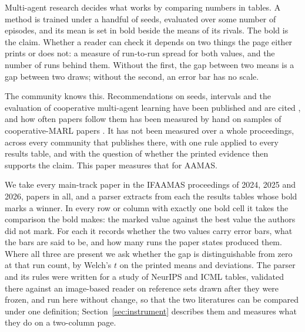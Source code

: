 \documentclass[sigconf,anonymous]{aamas}
\begin{document}
Multi-agent research decides what works by comparing numbers in tables. A
method is trained under a handful of seeds, evaluated over some number of
episodes, and its mean is set in bold beside the means of its rivals. The bold
is the claim. Whether a reader can check it depends on two things the page
either prints or does not: a measure of run-to-run spread for both values, and
the number of runs behind them. Without the first, the gap between two means
is a gap between two draws; without the second, an error bar has no scale.

The community knows this. Recommendations on seeds, intervals and the
evaluation of cooperative multi-agent learning have been published and
are cited
\cite{henderson2017deep,colas2018how,agarwal2021deep,gorsane2022towards,patterson2024empirical},
and how often papers follow them has been measured by hand on samples of
cooperative-MARL papers \cite{gorsane2022towards,singh2023how}. It has not
been measured over a whole proceedings, across every community that
publishes there, with one rule applied to every results table, and with
the question of whether the printed evidence then supports the claim.
This paper measures that for AAMAS.

We take every main-track paper in the IFAAMAS proceedings of 2024, 2025 and
2026, \nAPapers{} papers in all, and a parser extracts from each the results
tables whose bold marks a winner. In every row or column with exactly one
bold cell it takes the comparison the bold makes: the marked value against
the best value the authors did not mark. For each it records whether the two
values carry error bars, what the bars are said to be, and how many runs the
paper states produced them. Where all three are present we ask whether the
gap is distinguishable from zero at that run count, by Welch's $t$ on the
printed means and deviations. The parser and its rules were written for a
study of NeurIPS and ICML tables, validated there against an image-based
reader on reference sets drawn after they were frozen, and run here without
change, so that the two literatures can be compared under one definition;
Section~\ref{sec:instrument} describes them and measures what they do on a
two-column page.
\end{document}
